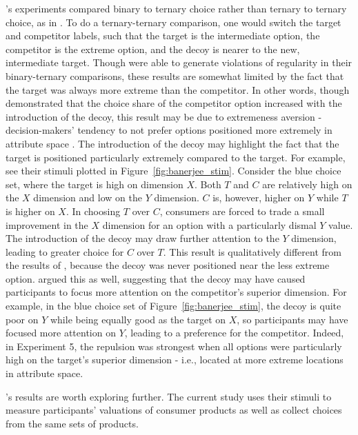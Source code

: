 \textcite{banerjeeFactorsThatPromote2024}'s experiments compared binary to ternary choice rather than ternary to ternary choice, as in \textcite{spektorWhenGoodLooks2018b}. To do a ternary-ternary comparison, one would switch the target and competitor labels, such that the target is the intermediate option, the competitor is the extreme option, and the decoy is nearer to the new, intermediate target. Though \textcite{banerjeeFactorsThatPromote2024} were able to generate violations of regularity in their binary-ternary comparisons, these results are somewhat limited by the fact that the target was always more extreme than the competitor. In other words, though \textcite{banerjeeFactorsThatPromote2024} demonstrated that the choice share of the competitor option increased with the introduction of the decoy, this result may be due to extremeness aversion -  decision-makers' tendency to not prefer options positioned more extremely in attribute space \parencite{simonson1992choice}. The introduction of the decoy may highlight the fact that the target is positioned particularly extremely compared to the target. For example, see their stimuli plotted in Figure~\ref{fig:banerjee_stim}. Consider the blue choice set, where the target is high on dimension $X$. Both $T$ and $C$ are relatively high on the $X$ dimension and low on the $Y$ dimension. $C$ is, however, higher on $Y$ while $T$ is higher on $X$. In choosing $T$ over $C$, consumers are forced to trade a small improvement in the $X$ dimension for an option with a particularly dismal $Y$ value. The introduction of the decoy may draw further attention to the $Y$ dimension, leading to greater choice for $C$ over $T$. This result is qualitatively different from the results of \textcite{spektorWhenGoodLooks2018b}, because the decoy was never positioned near the less extreme option. \textcite{banerjeeFactorsThatPromote2024} argued this as well, suggesting that the decoy may have caused participants to focus more attention on the competitor's superior dimension. For example, in the blue choice set of Figure~\ref{fig:banerjee_stim}, the decoy is quite poor on $Y$ while being equally good as the target on $X$, so participants may have focused more attention on $Y$, leading to a preference for the competitor. Indeed, in Experiment 5, the repulsion was strongest when all options were particularly high on the target's superior dimension - i.e., located at more extreme locations in attribute space.

\textcite{banerjeeFactorsThatPromote2024}'s results are worth exploring further. The current study uses their stimuli to measure participants' valuations of consumer products as well as collect choices from the same sets of products.

